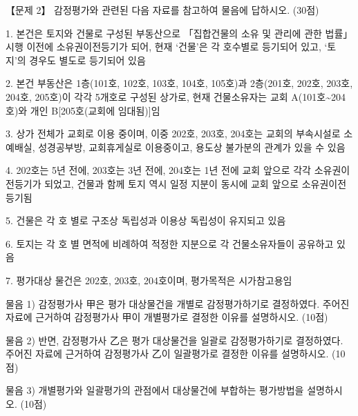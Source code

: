 \begin{longquestion}{【문제 2】}
감정평가와 관련된 다음 자료를 참고하여 물음에 답하시오. (30점) \par
\begin{framedtext}
1. 본건은 토지와 건물로 구성된 부동산으로 「집합건물의 소유 및 관리에 관한 법률」 시행 이전에 소유권이전등기가 되어, 현재 ‘건물’은 각 호수별로 등기되어 있고, ‘토지’의 경우도 별도로 등기되어 있음 \par
2. 본건 부동산은 1층(101호, 102호, 103호, 104호, 105호)과 2층(201호, 202호, 203호, 204호, 205호)이 각각 5개호로 구성된 상가로, 현재 건물소유자는 교회 A(101호\textasciitilde{}204호)와 개인 B[205호(교회에 임대됨)]임 \par
3. 상가 전체가 교회로 이용 중이며, 이중 202호, 203호, 204호는 교회의 부속시설로 소예배실, 성경공부방, 교회휴게실로 이용중이고, 용도상 불가분의 관계가 있을 수 있음 \par
4. 202호는 5년 전에, 203호는 3년 전에, 204호는 1년 전에 교회 앞으로 각각 소유권이전등기가 되었고, 건물과 함께 토지 역시 일정 지분이 동시에 교회 앞으로 소유권이전등기됨 \par
5. 건물은 각 호 별로 구조상 독립성과 이용상 독립성이 유지되고 있음 \par
6. 토지는 각 호 별 면적에 비례하여 적정한 지분으로 각 건물소유자들이 공유하고 있음 \par
7. 평가대상 물건은 202호, 203호, 204호이며, 평가목적은 시가참고용임 \par
\end{framedtext}
\medskip\noindent 물음 1) 감정평가사 甲은 평가 대상물건을 개별로 감정평가하기로 결정하였다. 주어진 자료에 근거하여 감정평가사 甲이 개별평가로 결정한 이유를 설명하시오. (10점) \par
\medskip\noindent 물음 2) 반면, 감정평가사 乙은 평가 대상물건을 일괄로 감정평가하기로 결정하였다. 주어진 자료에 근거하여 감정평가사 乙이 일괄평가로 결정한 이유를 설명하시오. (10점) \par
\medskip\noindent 물음 3) 개별평가와 일괄평가의 관점에서 대상물건에 부합하는 평가방법을 설명하시오. (10점) \par
\end{longquestion}
